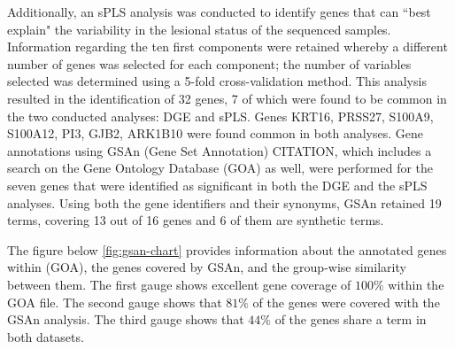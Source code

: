 \documentclass[journal, a4paper]{IEEEtran}
\begin{document}
Additionally, an sPLS analysis was conducted to identify genes that can ``best explain" the variability in the lesional status of the sequenced samples. Information regarding the ten first components were retained whereby a different number of genes was selected for each component; the number of variables selected was determined using a 5-fold cross-validation method. This analysis resulted in the identification of 32 genes, 7 of which were found to be common in the two conducted analyses: DGE and sPLS. Genes KRT16, PRSS27, S100A9, S100A12, PI3, GJB2, ARK1B10 were found common in both analyses. Gene annotations using GSAn (Gene Set Annotation) CITATION, which includes a search on the Gene Ontology Database (GOA) as well, were performed for the seven genes that were identified as significant in both the DGE and the sPLS analyses. Using both the gene identifiers and their synonyms, GSAn retained 19 terms, covering 13 out of 16 genes and 6 of them are synthetic terms.

The figure below \ref{fig:gsan-chart} provides information about the annotated genes within (GOA), the genes covered by GSAn, and the group-wise similarity between them. The first gauge shows excellent gene coverage of $100\%$ within the GOA file. The second gauge shows that $81\%$ of the genes were covered with the GSAn analysis. The third gauge shows that $44\%$ of the genes share a term in both datasets. 
\end{document}
